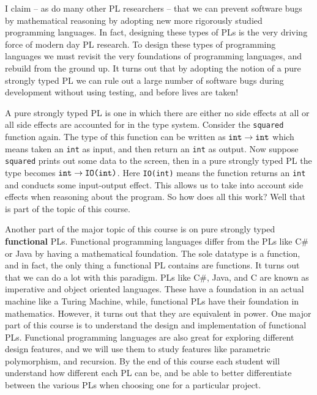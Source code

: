 \documentclass{article}
\begin{document}
I claim -- as do many other PL researchers -- that we can prevent
software bugs by mathematical reasoning by adopting new more
rigorously studied programming languages.  In fact, designing these
types of PLs is the very driving force of modern day PL research.  To
design these types of programming languages we must revisit the very
foundations of programming languages, and rebuild from the ground up.
It turns out that by adopting the notion of a pure strongly typed PL
we can rule out a large number of software bugs during development
without using testing, and before lives are taken!

A pure strongly typed PL is one in which there are either no side
effects at all or all side effects are accounted for in the type
system.  Consider the \verb|squared| function again.  The type of this
function can be written as $\verb|int| \to \verb|int|$ which means
taken an \verb|int| as input, and then return an \verb|int| as output.
Now suppose \verb|squared| prints out some data to the screen, then in
a pure strongly typed PL the type becomes $\verb|int| \to
\verb|IO(int)|$.  Here \verb|IO(int)| means the function returns an
\verb|int| and conducts some input-output effect.  This allows us to
take into account side effects when reasoning about the program.  So
how does all this work?  Well that is part of the topic of this
course.

Another part of the major topic of this course is on pure strongly
typed \textbf{functional} PLs.  Functional programming languages
differ from the PLs like C\# or Java by having a mathematical
foundation.  The sole datatype is a function, and in fact, the only
thing a functional PL contains are functions.  It turns out that we
can do a lot with this paradigm.  PLs like C\#, Java, and C are known
as imperative and object oriented languages.  These have a foundation
in an actual machine like a Turing Machine, while, functional PLs have
their foundation in mathematics.  However, it turns out that they are
equivalent in power.  One major part of this course is to understand
the design and implementation of functional PLs.  Functional
programming languages are also great for exploring different design
features, and we will use them to study features like parametric
polymorphism, and recursion.  By the end of this course each student
will understand how different each PL can be, and be able to better
differentiate between the various PLs when choosing one for a
particular project.
\end{document}
